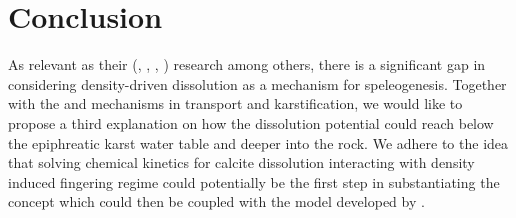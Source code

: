 \section{Conclusion}\label{sec:conclusionLiterature}
As relevant as their (\citet{Dreybrodt1996}, \citet{gabrovvsek2000role}, \citet{dreybrodt2004dissolution}, \citet{Dreybrodt2012}) 
research among others, there is a significant gap in considering density-driven dissolution as a mechanism for speleogenesis. 
Together with the \citet{gabrovvsek2000role} and \citet{bogli1980physical} mechanisms in transport and karstification, 
we would like to propose a third explanation on how the dissolution potential could reach below the epiphreatic karst water table 
and deeper into the rock. We adhere to the idea that solving chemical kinetics for calcite dissolution interacting with density 
induced fingering regime could potentially be the first step in substantiating the concept which could then be coupled with the 
model developed by \citet{Class2020}.
\endinput
